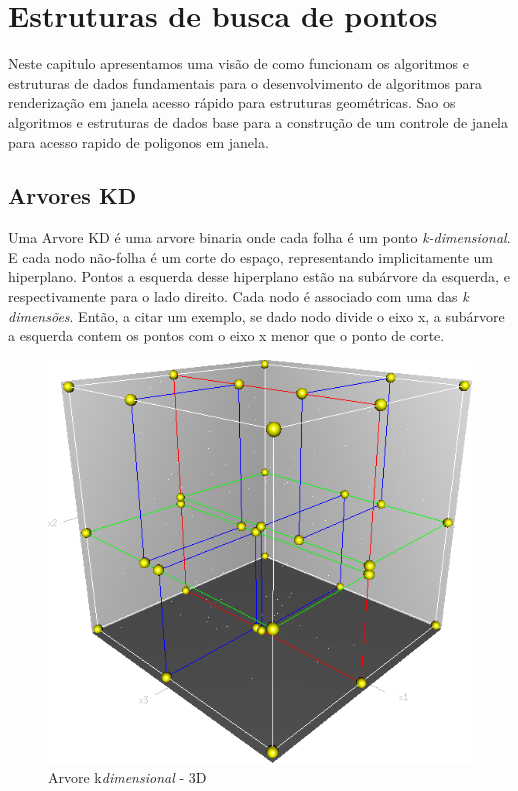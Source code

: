 \chapter{Estruturas de busca de pontos}\label{cap:desenvolvimento}
Neste capitulo apresentamos uma visão de como funcionam os algoritmos e estruturas de dados fundamentais para o desenvolvimento
de algoritmos para renderização em janela acesso rápido para estruturas geométricas.
Sao os algoritmos e estruturas de dados base para a construção de um controle de janela para acesso rapido de poligonos
em janela.

\section{Arvores KD}

Uma Arvore KD é uma arvore binaria onde cada folha é um ponto \textit{k-dimensional}.
E cada nodo não-folha é um corte do espaço, representando implicitamente um hiperplano.
Pontos a esquerda desse hiperplano estão na subárvore da esquerda, e respectivamente para o lado direito.
Cada nodo é associado com uma das \textit{k dimensões}. Então, a citar um exemplo, se dado nodo divide o eixo
x, a subárvore a esquerda contem os pontos com o eixo x menor que o ponto de corte.

\begin{figure}[htb]
    \caption{\label{fig:Fig_1}Arvore k\textit{dimensional} - 3D}
    \begin{center}
        \includegraphics[width=\linewidth/2]{./images/3dtree.png}
    \end{center}
\end{figure}

